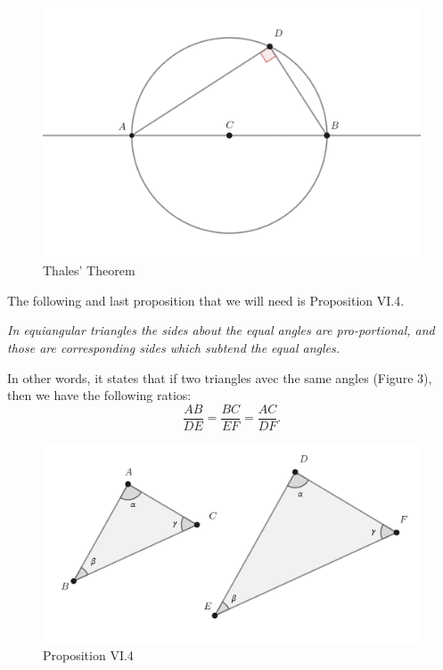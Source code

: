 \documentclass{article}
\theoremstyle{plain}
\theoremstyle{definition}
\newenvironment{customthm}[1]
  {\renewcommand\theinnercustomthm{#1}\innercustomthm}
  {\endinnercustomthm}
\begin{document}
\begin{figure}[h!]
    \centering
    \includegraphics[scale=0.34]{pics/Thales Theorem.png}
    \caption{Thales' Theorem}
\end{figure}

The following and last proposition that we will need is Proposition VI.4.

\begin{customthm}{VI.4}\label{6.4}
    \textit{In equiangular triangles the sides about the equal angles are pro-portional, and those are corresponding sides which subtend the equal angles.}
\end{customthm}

In other words, it states that if two triangles avec the same angles (Figure 3), then we have the following ratios:
$$\frac{AB}{DE} = \frac{BC}{EF} = \frac{AC}{DF}.$$

\begin{figure}[h!]
    \centering
    \includegraphics[scale=0.42]{pics/Prop6.4.png}
    \caption{Proposition VI.4}
\end{figure}
\end{document}
